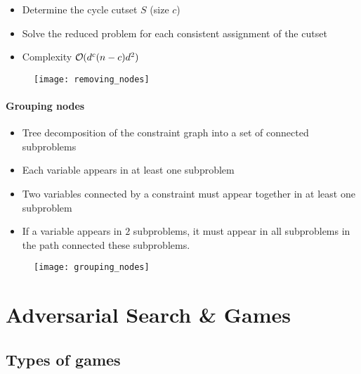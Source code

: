 \begin{minipage}{0.58\textwidth}
	\begin{itemize}
	\item Determine the cycle cutset $S$ (size $c$)
	\item Solve the reduced problem for each consistent assignment of the cutset
	\item Complexity $\bigO (d^c (n-c)d^2)$
	\end{itemize}
\end{minipage}
\begin{minipage}{0.4\textwidth}
	\begin{figure}[H]
		\centering
		\texttt{[image: removing\_nodes]}
	\end{figure}
\end{minipage}


\paragraph{Grouping nodes}

\begin{minipage}{0.58\textwidth}
	\begin{itemize}
	\item Tree decomposition of the constraint graph into a set of connected subproblems
	\item Each variable appears in at least one subproblem
	\item Two variables connected by a constraint must appear together in at least one subproblem
	\item If a variable appears in $2$ subproblems, it must appear in all subproblems in the path connected these subproblems.
	\end{itemize}
\end{minipage}
\begin{minipage}{0.4\textwidth}
	\begin{figure}[H]
		\centering
		\texttt{[image: grouping\_nodes]}
	\end{figure}
\end{minipage}

\section{Adversarial Search \& Games}

\subsection{Types of games}

